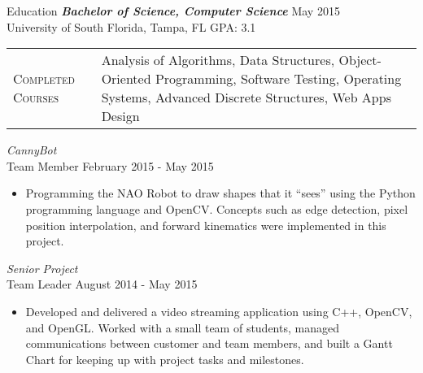 \begin{section}{Education}
  {\sl \textbf{Bachelor of Science, Computer Science}} \hfill May 2015 \\
  University of South Florida, Tampa, FL \hfill GPA: 3.1 \\
  \begin{tabularx}{\linewidth}{@{}l X@{}}
    \textsc{Completed Courses} &\small{Analysis of Algorithms, Data Structures, Object-Oriented Programming, Software Testing, Operating Systems, Advanced Discrete Structures, Web Apps Design}\\
  \end{tabularx}
  {\sl CannyBot} \\ Team Member \hfill February 2015 - May 2015
  \begin{itemize}
    \item Programming the NAO Robot to draw shapes that it ``sees'' using the Python programming language and OpenCV. Concepts such as edge detection, pixel position interpolation, and forward kinematics were implemented in this project.
  \end{itemize}
  {\sl Senior Project} \\ Team Leader \hfill August 2014 - May 2015
  \begin{itemize}
    \item Developed and delivered a video streaming application using C++, OpenCV, and OpenGL. Worked with a small team of students, managed communications between customer and team members, and built a Gantt Chart for keeping up with project tasks and milestones.
  \end{itemize}
\end{section}
